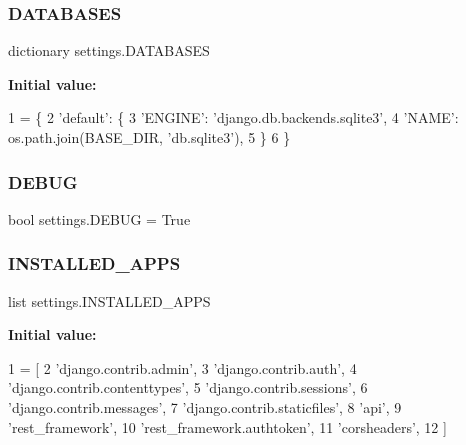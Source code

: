 \subsubsection{\texorpdfstring{D\+A\+T\+A\+B\+A\+S\+ES}{DATABASES}}
{\footnotesize\ttfamily dictionary settings.\+D\+A\+T\+A\+B\+A\+S\+ES}

{\bfseries Initial value\+:}
\begin{DoxyCode}
1 =  \{
2     \textcolor{stringliteral}{'default'}: \{
3         \textcolor{stringliteral}{'ENGINE'}: \textcolor{stringliteral}{'django.db.backends.sqlite3'},
4         \textcolor{stringliteral}{'NAME'}: os.path.join(BASE\_DIR, \textcolor{stringliteral}{'db.sqlite3'}),
5     \}
6 \}
\end{DoxyCode}
\mbox{\label{namespacesettings_aa6d4989391656abd3f59c0bd3c2f364c}} 
\subsubsection{\texorpdfstring{D\+E\+B\+UG}{DEBUG}}
{\footnotesize\ttfamily bool settings.\+D\+E\+B\+UG = True}

\mbox{\label{namespacesettings_af1f29969b17cf837dbf21f455721d71d}} 
\subsubsection{\texorpdfstring{I\+N\+S\+T\+A\+L\+L\+E\+D\+\_\+\+A\+P\+PS}{INSTALLED\_APPS}}
{\footnotesize\ttfamily list settings.\+I\+N\+S\+T\+A\+L\+L\+E\+D\+\_\+\+A\+P\+PS}

{\bfseries Initial value\+:}
\begin{DoxyCode}
1 =  [
2     \textcolor{stringliteral}{'django.contrib.admin'},
3     \textcolor{stringliteral}{'django.contrib.auth'},
4     \textcolor{stringliteral}{'django.contrib.contenttypes'},
5     \textcolor{stringliteral}{'django.contrib.sessions'},
6     \textcolor{stringliteral}{'django.contrib.messages'},
7     \textcolor{stringliteral}{'django.contrib.staticfiles'},
8     \textcolor{stringliteral}{'api'},
9     \textcolor{stringliteral}{'rest\_framework'},
10     \textcolor{stringliteral}{'rest\_framework.authtoken'},
11     \textcolor{stringliteral}{'corsheaders'},
12 ]
\end{DoxyCode}
\mbox{\label{namespacesettings_aa9ff7f0ab5306c06ce415aec41c11e77}} 
